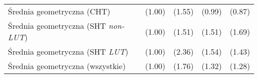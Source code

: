 \begin{table}
\begin{tabularx}{\linewidth}{c l X r r r r}


        \multicolumn{3}{l}{Średnia geometryczna (CHT)}&(1.00)&(1.55)&(0.99)&(0.87) \\
        \multicolumn{3}{l}{Średnia geometryczna (SHT \textit{non-LUT})}&(1.00)&(1.51)&(1.51)&(1.69)\\
        \multicolumn{3}{l}{Średnia geometryczna (SHT \textit{LUT})}&(1.00)&(2.36)&(1.54)&(1.43)\\
        \multicolumn{3}{l}{Średnia geometryczna (wszystkie)}&(1.00)&(1.76)&(1.32)&(1.28)\\\hline
    \end{tabularx}

\end{table}
